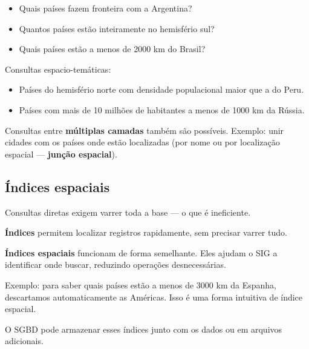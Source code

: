 \begin{itemize}
 \item Quais países fazem fronteira com a Argentina?
 \item Quantos países estão inteiramente no hemisfério sul?
 \item Quais países estão a menos de 2000 km do Brasil?
\end{itemize}

Consultas espacio-temáticas:

\begin{itemize}
 \item Países do hemisfério norte com densidade populacional maior que a do Peru.
 \item Países com mais de 10 milhões de habitantes a menos de 1000 km da Rússia.
\end{itemize}

Consultas entre \textbf{múltiplas camadas} também são possíveis. Exemplo: unir cidades com os países onde estão localizadas (por nome ou por localização espacial — \textbf{junção espacial}).

\subsection{Índices espaciais}

Consultas diretas exigem varrer toda a base — o que é ineficiente.

\textbf{Índices} permitem localizar registros rapidamente, sem precisar varrer tudo.

\textbf{Índices espaciais} funcionam de forma semelhante. Eles ajudam o SIG a identificar onde buscar, reduzindo operações desnecessárias.

Exemplo: para saber quais países estão a menos de 3000 km da Espanha, descartamos automaticamente as Américas. Isso é uma forma intuitiva de índice espacial.

O SGBD pode armazenar esses índices junto com os dados ou em arquivos adicionais.

\pagestyle{empty}
